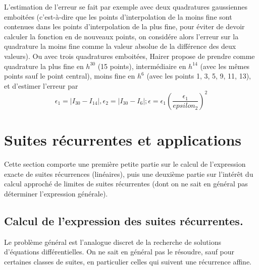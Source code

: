 \documentclass[a4paper,11pt]{article}
\begin{document}
L'estimation de l'erreur se fait par exemple avec deux quadratures
gaussiennes emboit\'ees (c'est-\`a-dire que les points d'interpolation
de la moins fine sont contenues dans les points d'interpolation de la
plus fine, pour \'eviter de devoir calculer la fonction en de nouveaux
points, on consid\'ere alors l'erreur sur la quadrature la moins fine
comme la valeur absolue de la diff\'erence des deux valeurs). Ou avec
trois quadratures emboit\'ees,
Hairer propose de prendre comme quadrature la plus fine en $h^{30}$
(15 points), interm\'ediaire en $h^{14}$ (avec les m\^emes points
sauf le point central), moins fine en $h^6$ (avec les points 1, 3, 5,
9, 11, 13), et d'estimer l'erreur par 
$$ \epsilon_1=| I_{30}-I_{14}|,  \epsilon_2=| I_{30}-I_{6}|; 
\epsilon = \epsilon_1 \left(\frac{\epsilon_1}{epsilon_2} \right)^2 $$

\section{Suites récurrentes et applications} \label{sec:rec}
Cette section comporte une première petite partie sur le calcul
de l'expression exacte de suites récurrences (linéaires), puis
une deuxième partie sur l'intérêt du calcul approché de limites
de suites récurrentes (dont on ne sait en général pas déterminer l'expression
générale).

\subsection{Calcul de l'expression des suites récurrentes.}
Le problème général est l'analogue discret de la recherche de solutions
d'équations différentielles. On ne sait en général pas le résoudre, sauf
pour certaines classes de suites, en particulier celles qui suivent
une récurrence affine.
\end{document}
